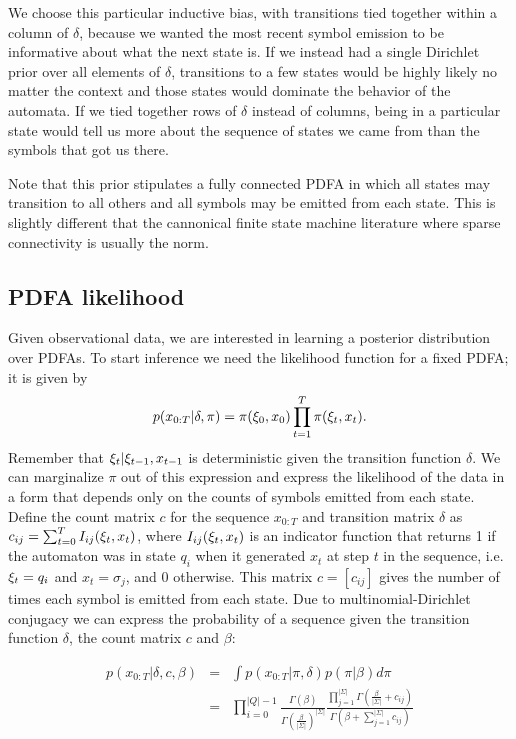 %
We choose this particular inductive bias, with transitions tied together within a column of $\delta$, because we wanted the most recent symbol emission to be informative about what the next state is.  If we instead had a single Dirichlet prior over all elements of $\delta$, transitions to a few states would be highly likely no matter the context and those states would dominate the behavior of the automata.  If we tied together rows of $\delta$ instead of columns, being in a particular state would tell us more about the sequence of states we came from than the symbols that got us there.  

 Note that this prior stipulates a fully connected PDFA in which all states may transition to all others and all symbols may be emitted from each state.  This is slightly different that the cannonical finite state machine literature where sparse connectivity is usually the norm.

\subsection{PDFA likelihood}

Given observational data, we are interested in learning a posterior distribution over PDFAs.  To start inference we need the likelihood function for a fixed PDFA; it is given by
%
\[ p(x_{0:T}|\delta,\pi) = \pi(\q_0,x_0)\prod_{t=1}^T \pi(\q_t,x_t) \label{x:def}. \]
%
Remember that $\q_t | \q_{t-1}, x_{t-1}$ is deterministic given the transition function $\delta$. 
We can marginalize $\pi$ out of this expression and express the likelihood of the data in a form that depends only on the counts of symbols emitted from each state.  Define the count matrix $c$ for the sequence $x_{0:T}$ and transition matrix $\delta$ as $c_{ij} = \sum_{t=0}^T I_{ij}(\q_t,x_t)$, where $I_{ij}(\q_t,x_t)$ is an indicator function that returns 1 if the automaton was in state $q_i$ when it generated $x_t$ at step $t$ in the sequence, i.e. $\q_t = q_i$ and $x_t = \sigma_j$, and 0 otherwise. This matrix $c = [c_{ij}]$ gives the number of times each symbol is emitted from each state.  Due to multinomial-Dirichlet conjugacy we can express the probability of a sequence given the transition function $\delta$, the count matrix $c$ and $\beta$:

\begin{eqnarray}
 p(x_{0:T}|\delta,c,\beta) & = & \int p(x_{0:T}|\pi,\delta) p(\pi|\beta) d\pi \label{x:factor} \nonumber \\
 & = & \prod_{i=0}^{|Q|-1} \frac{\Gamma(\beta)}{\Gamma(\frac{\beta}{|\Sigma|})^{|\Sigma|}} \frac{\prod_{j=1}^{|\Sigma|}\Gamma(\frac{\beta}{|\Sigma|} + c_{ij})}{\Gamma(\beta + \sum_{j=1}^{|\Sigma|} c_{ij})} \label{x:end}
 \end{eqnarray}
 
